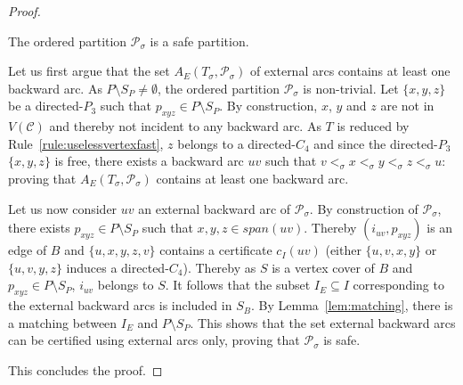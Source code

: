 \begin{proof}
\begin{claim} \label{cl:safe-partition}
The ordered partition $\mathcal{P}_\sigma$ is a safe partition.
\end{claim}
\begin{proofclaim}
Let us first argue that the set $A_E(T_\sigma,\mathcal{P}_\sigma)$ of external arcs contains at least one backward arc. As $P\setminus S_P\neq\emptyset$, the ordered partition $\mathcal{P}_\sigma$ is non-trivial. Let $\{x,y,z\}$ be a directed-$P_3$ such that $p_{xyz}\in P\setminus S_P$. By construction, $x$, $y$ and $z$ are not in $V(\mathcal{C})$ and thereby not incident to any backward arc. As $T$ is reduced by Rule~\ref{rule:uselessvertexfast}, $z$ belongs to a directed-$C_4$ and since the directed-$P_3$ $\{x,y,z\}$ is free, there exists a backward arc $uv$ such that $v<_{\sigma} x<_{\sigma} y<_{\sigma} z<_{\sigma} u$: proving that  $A_E(T_\sigma,\mathcal{P}_\sigma)$ contains at least one backward arc.

Let us now consider $uv$ an external backward arc of $\mathcal{P}_\sigma$. By construction of $\mathcal{P}_\sigma$, there exists $p_{xyz}\in P\setminus S_P$ such that $x,y,z\in span(uv)$. Thereby $(i_{uv},p_{xyz})$ is an edge of $B$ and $\{u,x,y,z,v\}$ contains a certificate $c_I(uv)$ (either $\{u,v,x,y\}$ or $\{u,v,y,z\}$ induces a directed-$C_4$). Thereby as $S$ is a vertex cover of $B$ and $p_{xyz}\in P\setminus S_P$, $i_{uv}$ belongs to $S$. It follows that the subset $I_E\subseteq I$ corresponding to the external backward arcs is included in $S_B$. By Lemma~\ref{lem:matching}, there is a matching between $I_E$ and $P\setminus S_P$. This shows that the set external backward arcs can be certified using external arcs only, proving that $\mathcal{P}_\sigma$ is safe.
\end{proofclaim}

This concludes the proof.
\end{proof}

